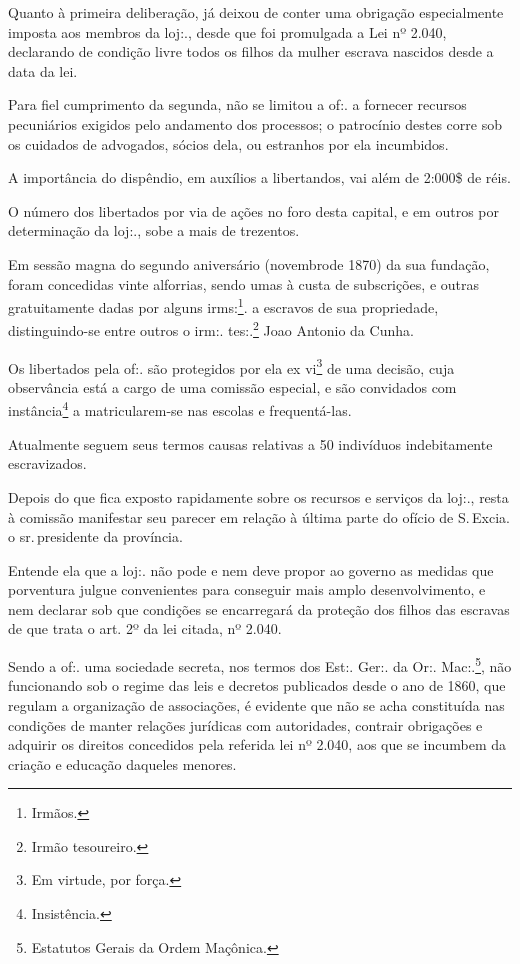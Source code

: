 Quanto à primeira deliberação, já deixou de conter uma obrigação
especialmente imposta aos membros da loj:., desde que foi promulgada a
Lei nº 2.040, declarando de condição livre todos os filhos da mulher
escrava nascidos desde a data da lei.

Para fiel cumprimento da segunda, não se limitou a of:. a fornecer
recursos pecuniários exigidos pelo andamento dos processos; o patrocínio
destes corre sob os cuidados de advogados, sócios dela, ou estranhos por
ela incumbidos.

A importância do dispêndio, em auxílios a libertandos, vai além de
2:000\$ de réis.

O número dos libertados por via de ações no foro desta capital, e em
outros por determinação da loj:., sobe a mais de trezentos.

Em sessão magna do segundo aniversário (novembrode 1870) da sua
fundação, foram concedidas vinte alforrias, sendo umas à custa de
subscrições, e outras gratuitamente dadas por alguns irms:\footnote{
  Irmãos.}. a escravos de sua propriedade, distinguindo-se entre outros
o irm:. tes:.\footnote{ Irmão tesoureiro.} Joao Antonio da Cunha.

Os libertados pela of:. são protegidos por ela ex vi\footnote{ Em
  virtude, por força.} de uma decisão, cuja observância está a cargo de
uma comissão especial, e são convidados com instância\footnote{
  Insistência.} a matricularem-se nas escolas e frequentá-las.

Atualmente seguem seus termos causas relativas a 50 indivíduos
indebitamente escravizados.

Depois do que fica exposto rapidamente sobre os recursos e serviços da
loj:., resta à comissão manifestar seu parecer em relação à última parte
do ofício de S.\,Excia. o sr.\,presidente da província.

\asterisc

Entende ela que a loj:. não pode e nem deve propor ao governo as medidas
que porventura julgue convenientes para conseguir mais amplo
desenvolvimento, e nem declarar sob que condições se encarregará da
proteção dos filhos das escravas de que trata o art. 2º da lei citada,
nº 2.040.

Sendo a of:. uma sociedade secreta, nos termos dos Est:. Ger:. da Or:.
Mac:.\footnote{ Estatutos Gerais da Ordem Maçônica.}, não funcionando
sob o regime das leis e decretos publicados desde o ano de 1860, que
regulam a organização de associações, é evidente que não se acha
constituída nas condições de manter relações jurídicas com autoridades,
contrair obrigações e adquirir os direitos concedidos pela referida lei
nº 2.040, aos que se incumbem da criação e educação daqueles menores.


